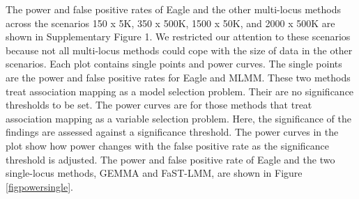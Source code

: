 \documentclass{bioinfo}
\begin{document}
The power and false positive rates of Eagle and the other multi-locus methods across the scenarios 150 x 5K, 350 x 500K, 1500 x 50K, and 2000 x 500K are shown in Supplementary Figure 1.  We restricted our attention to these scenarios because not all 
multi-locus methods could cope with the size of data in the other scenarios. 
  Each plot contains 
single points and power curves. The single points are the power and false positive rates for Eagle and MLMM.
These two methods treat association mapping as a model selection problem. Their are no significance thresholds to be set. 
The power curves are for those methods that treat association mapping as a variable selection problem. Here, the 
significance of the findings are assessed against a significance threshold. The power curves in the plot show how power changes with 
the false positive rate as the significance threshold  is adjusted. 
The power and false positive rate of Eagle and the two single-locus methods, GEMMA and FaST-LMM,  are shown in
 Figure \ref{figpowersingle}. 




\end{document}

